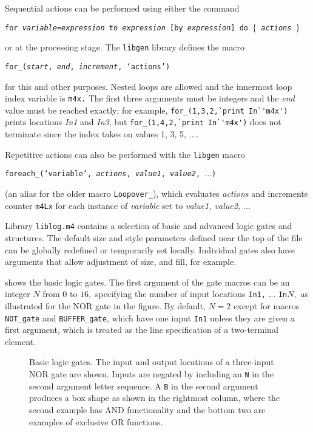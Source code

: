 \pagebreak
{}
Sequential actions can be performed using either the
 \dpic command

{\tt for {\sl variable}={\sl expression} to {\sl expression}
 [by {\sl expression}] do $\lbrace$ {\sl actions} $\rbrace$}

\noindent
or at the
\Mfour processing stage.  The {\tt libgen} library defines the macro

{\tt for\_({\sl start}, {\sl end}, {\sl increment}, `{\sl actions}')}

\noindent
for this and other purposes.  Nested loops are allowed and the innermost loop
index variable is {\tt m4x.}
The first three arguments must be
integers and the {\sl end} value must be reached exactly; for example,
\verb|for_(1,3,2,`print In`'m4x')| prints locations {\sl In1} and {\sl In3},
but \verb|for_(1,4,2,`print In`'m4x')| does not terminate since the
index takes on values 1, 3, 5, $\ldots$.

Repetitive actions can also be performed with the {\tt libgen} macro

{\tt foreach\_(`{\sl variable}', {\sl actions}, {\sl value1},
 {\sl value2}, $\ldots$)}

\noindent
(an alias for the older macro {\tt Loopover\_}),
which evaluates {\sl actions} and increments counter {\tt m4Lx}
for each instance of {\sl variable} set to {\sl value1, value2, $\ldots$}

Library {\tt liblog.m4} contains a selection of basic and advanced logic
gates and structures.  The default size and style parameters defined
near the top of the file can be globally redefined or temporarily set
locally. Individual gates also have arguments that allow adjustment of
size, and fill, for example.

 shows the basic logic gates.  The first argument of the gate
macros can be an integer $N$ from $0$ to $16,$ specifying the number
of input locations {\tt In1,} $\ldots$ {\tt In}$N,$ as illustrated
for the NOR gate in the figure.  By default, $N=2$ except for macros
{\tt NOT\_gate} and {\tt BUFFER\_gate}, which have one input {\tt In1}
unless they are given a first argument, which is treated as the line
specification of a two-terminal element.
\begin{figure}[H]
   \vspace*{-0.5\baselineskip}
   
   \caption{Basic logic gates.  The input and output locations of
      a three-input NOR gate are shown.  Inputs are negated by
      including an {\tt N} in the second argument letter sequence.  A {\tt B}
      in the second argument produces a box shape as shown in the rightmost
      column, where the second example has AND functionality and
      the bottom two are examples of exclusive OR functions.}
   \label{Logic}
   \end{figure}

